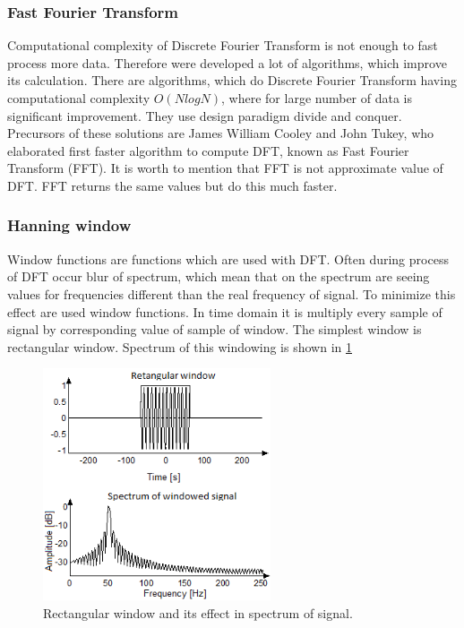 \documentclass[11pt,titlepage]{article}
\theoremstyle{plain}
\begin{document}
\subsubsection{Fast Fourier Transform}
Computational complexity of Discrete Fourier Transform is not enough to fast process more data. Therefore were developed a lot of algorithms, which improve its calculation. There are algorithms, which do Discrete Fourier Transform having computational complexity $O(NlogN)$, where for large number of data is significant improvement. They use design paradigm divide and conquer. Precursors of these solutions are James William Cooley and John Tukey, who elaborated first faster algorithm to compute DFT, known as Fast Fourier Transform (FFT). It is worth to mention that FFT is not approximate value of DFT. FFT returns the same values but do this much faster.

\subsubsection{Hanning window}
Window functions are functions which are used with DFT. Often during process of DFT occur blur of spectrum, which mean that on the spectrum are seeing values for frequencies different than the real frequency of signal. To minimize this effect are used window functions. In time domain it is multiply every sample of signal by corresponding value of sample of window. The simplest window is rectangular window. Spectrum of this windowing is shown in \ref{fig:F9}
\begin{figure}[H]
	\centering
	\includegraphics[width=0.6\textwidth]{img/rectangular_window}
	\caption{Rectangular window and its effect in spectrum of signal.}
	\label{fig:F9}
\end{figure}
\end{document}
